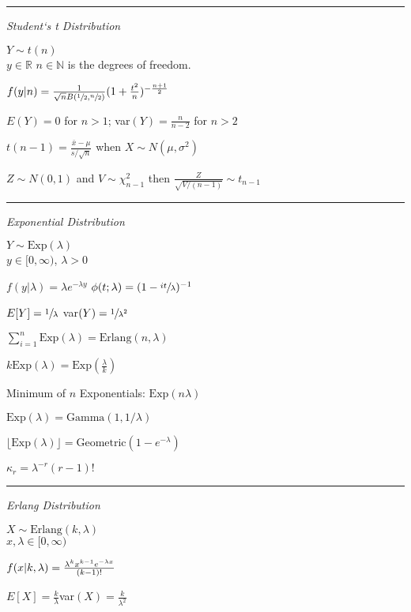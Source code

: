 \documentclass[notitlepage,10pt,twocolumn]{article}
\newcommand\sumn{\sum_{i=1}^n}
\begin{document}
\vspace{.15cm}\hrule \vspace{.15cm}

\emph{\sffamily Student`s t Distribution}

$Y \sim t(n)$\\
	$y \in \mathbb{R}$\quad
	$n \in \mathbb{N}$ is the degrees of freedom.

$f(y|n) = \frac{1}{\sqrt{n}B(\sfrac{1}{2},\sfrac{n}{2})}(1+\frac{t^2}{n})^{-\frac{n+1}{2}}$

$E(Y) = 0$ for $n >1$; var$(Y) = \frac{n}{n-2}$ for $n > 2$

$t(n-1) = \frac{\bar{x}-\mu}{s/\sqrt{n}}$ when $X \sim N(\mu,\sigma^2)$

$Z \sim N(0,1)$ and $V \sim \chi^2_{n-1}$ then $\frac{Z}{\sqrt{V/(n-1)}} \sim t_{n-1}$

\vspace{.15cm}\hrule \vspace{.15cm}

\emph{\sffamily Exponential Distribution}

$Y \sim \text{Exp}(\lambda)$\\
	$y \in [0,\infty)$, \quad $\lambda > 0 $

$f(y|\lambda) = \lambda e^{-\lambda y}$ \quad $\phi(t;\lambda) = (1-\sfrac{it}{\lambda})^{-1}$

$E[Y]= \sfrac{1}{\lambda}$ \quad var$(Y) = \sfrac{1}{\lambda^2}$

$\sumn \text{Exp}(\lambda) = \text{Erlang}(n,\lambda)$

$k\text{Exp}(\lambda) = \text{Exp}(\frac{\lambda}{k})$

Minimum of $n$ Exponentials: $\text{Exp}(n\lambda)$

$\text{Exp}(\lambda) = \text{Gamma}(1, 1/\lambda)$

$\lfloor\text{Exp}(\lambda)\rfloor = \text{Geometric}(1-e^{-\lambda})$

$\kappa_r = \lambda^{-r}(r-1)!$

\vspace{.15cm}\hrule \vspace{.15cm}

\emph{\sffamily Erlang Distribution}

$X \sim \text{Erlang}(k,\lambda)$\\
$x,\lambda \in [0,\infty)$

$f(x| k,\lambda)={\lambda^k x^{k-1} e^{-\lambda x} \over (k-1)!}$

$E[X] = \frac{k}{\lambda}$\quad var$(X) = \frac{k}{\lambda^2}$
\end{document}
